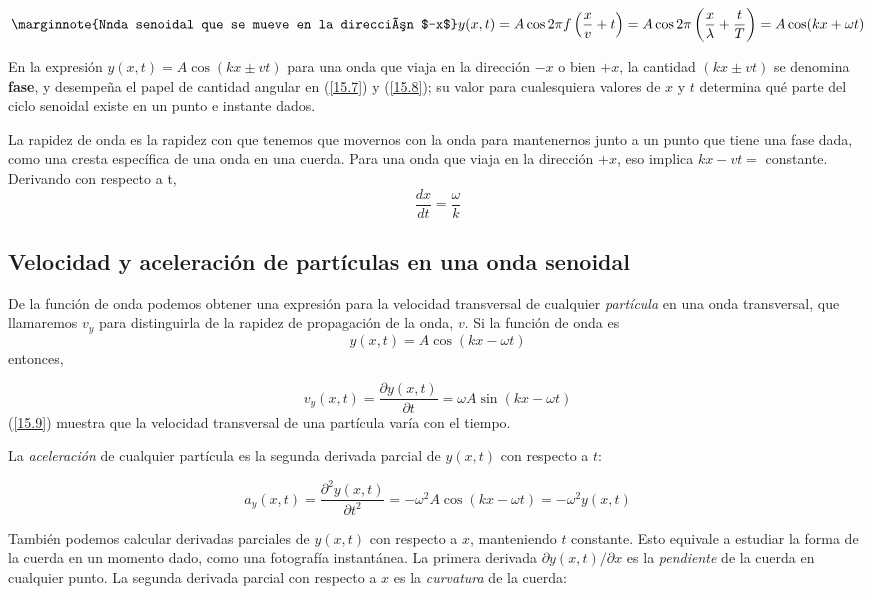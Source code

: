\begin{equation}\label{15.8}\marginnote{Nnda senoidal que se mueve en la dirección $-x$}
y(x,t)=A\cos 2\pi f\left(\frac{x}{v}+t\right)=A\cos 2\pi \left(\frac{x}{\lambda}+\frac{t}{T}\right)=A\cos (kx+\omega t)
\end{equation}

En la expresión $y(x, t) =A\cos (kx \pm vt)$ para una onda que viaja en la dirección $-x$ o bien $+x$, la cantidad $(kx \pm vt)$ se denomina \textbf{fase}, y desempeña el papel de cantidad angular en (\ref{15.7}) y (\ref{15.8}); su valor para cualesquiera valores de $x$ y $t$ determina qué parte del ciclo senoidal existe en un punto e instante dados.

La rapidez de onda es la rapidez con que tenemos que movernos con la onda para mantenernos junto a un punto que tiene una fase dada, como una cresta específica de una onda en una cuerda. Para una onda que viaja en la dirección $+x$, eso implica $kx - vt =$ constante. Derivando con respecto a t, $$\frac{dx}{dt}=\frac{\omega}{k}$$

\subsection{Velocidad y aceleración de partículas en una onda senoidal}
De la función de onda podemos obtener una expresión para la velocidad transversal de cualquier \textit{partícula} en una onda transversal, que llamaremos $v_y$ para distinguirla de la rapidez de propagación de la onda, $v$. Si la función de onda es $$y(x,t)=A\cos (kx-\omega t)$$ entonces,

\begin{equation}\label{15.9}
v_y(x,t)=\frac{\partial y(x,t)}{\partial t}=\omega A\sin (kx-\omega t)
\end{equation}
 (\ref{15.9}) muestra que la velocidad transversal de una partícula varía con el tiempo.
 
La \textit{aceleración} de cualquier partícula es la segunda derivada parcial de $y(x, t)$ con respecto a $t$:

\begin{equation}\label{15.10}
a_y(x,t)=\frac{\partial ^2y(x,t)}{\partial t^2}=-\omega ^2A\cos (kx-\omega t)=-\omega ^2y(x,t)
\end{equation}

También podemos calcular derivadas parciales de $y(x, t)$ con respecto a $x$, manteniendo $t$ constante. Esto equivale a estudiar la forma de la cuerda en un momento dado, como una fotografía instantánea. La primera derivada $\partial y(x,t)/\partial x$ es la \textit{pendiente} de la cuerda en cualquier punto. La segunda derivada parcial con respecto a $x$ es la \textit{curvatura} de la cuerda:


